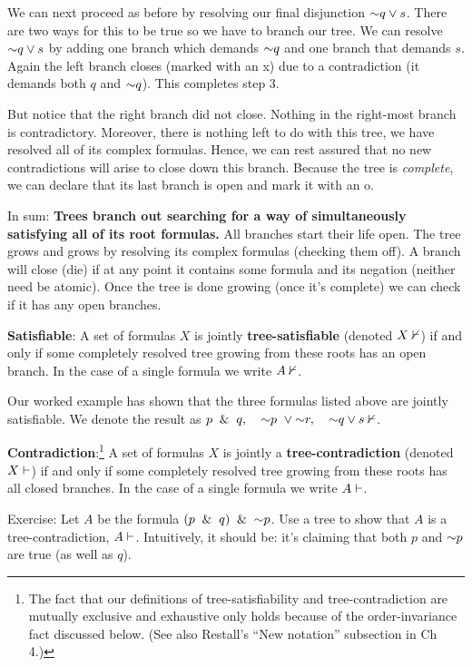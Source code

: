 \documentclass[options]{philosophersimprint}
\begin{document}
We can next proceed as before by resolving our final disjunction $\mathord{\sim} q \mathbin{\vee} s$. There are two ways for this to be true so we have to branch our tree. We can resolve $\mathord{\sim} q \mathbin{\vee} s$ by adding one branch which demands $\mathord{\sim} q$ and one branch that demands $s$. Again the left branch closes (marked with an x) due to a contradiction (it demands both $q$ and $\mathord{\sim} q$). This completes step 3.

But notice that the right branch did not close. Nothing in the right-most branch is contradictory. Moreover, there is nothing left to do with this tree, we have resolved all of its complex formulas. Hence, we can rest assured that no new contradictions will arise to close down this branch. Because the tree is \textit{complete}, we can declare that its last branch is open and mark it with an o.

In sum: \textbf{Trees branch out searching for a way of simultaneously satisfying all of its root formulas.} All branches start their life open. The tree grows and grows by resolving its complex formulas (checking them off). A branch will close (die) if at any point it contains some formula and its negation (neither need be atomic). Once the tree is done growing (once it's complete) we can check if it has any open branches.

\textbf{Satisfiable}: A set of formulas $X$ is jointly \textbf{tree-satisfiable} (denoted $X\nvdash$) if and only if some completely resolved tree growing from these roots has an open branch. In the case of a single formula we write $A\nvdash$.

Our worked example has shown that the three formulas listed above are jointly satisfiable. We denote the result as $p \ \mathbin{\&} \  q,\quad \mathord{\sim} p \ \mathbin{\vee} \mathord{\sim} r,\quad \mathord{\sim} q \mathbin{\vee} s \nvdash$.

\textbf{Contradiction}:\footnote{The fact that our definitions of tree-satisfiability and tree-contradiction are mutually exclusive and exhaustive only holds because of the order-invariance fact discussed below. (See also Restall's ``New notation'' subsection in Ch 4.)} A set of formulas $X$ is jointly a \textbf{tree-contradiction} (denoted $X\vdash$) if and only if some completely resolved tree growing from these roots has all closed branches. In the case of a single formula we write $A\vdash$.

Exercise: Let $A$ be the formula $(p \ \mathbin{\&} \   q)\ \mathbin{\&} \   \mathord{\sim} p$. Use a tree to show that $A$ is a tree-contradiction, $A\vdash$. Intuitively, it should be: it's claiming that both $p$ and $\mathord{\sim} p$ are true (as well as $q$).
\end{document}
